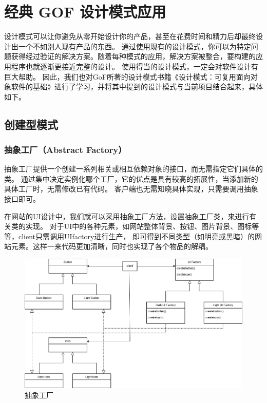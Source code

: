 \documentclass[12pt]{ctexart} %
\begin{document}
\section{经典 GOF 设计模式应用} %
设计模式可以让你避免从零开始设计你的产品，甚至在花费时间和精力后却最终设计出一个不如别人现有产品的东西。
通过使用现有的设计模式，你可以为特定问题获得经过验证的解决方案。随着每种模式的应用，解决方案被整合，要构建的应用程序也就逐渐更接近完整的设计。
使用得当的设计模式，一定会对软件设计有巨大帮助。
因此，我们也对GoF所著的设计模式书籍《设计模式：可复用面向对象软件的基础》进行了学习，并将其中提到的设计模式与当前项目结合起来，具体如下。


\subsection{创建型模式} %
\subsubsection{抽象工厂（Abstract Factory）} 
抽象工厂提供一个创建一系列相关或相互依赖对象的接口，而无需指定它们具体的类。
通过集中决定实例化哪个工厂，它的优点是具有较高的拓展性，当添加新的具体工厂时，无需修改已有代码。
客户端也无需知晓具体实现，只需要调用抽象接口即可。

在网站的UI设计中，我们就可以采用抽象工厂方法，设置抽象工厂类，来进行有关类的实现。
对于UI中的各种元素，如网站整体背景、按钮、图片背景、图标等等，client只需调用UIfactory进行生产，
即可得到不同类型（如明亮或黑暗）的网站元素。这样一来代码更加清晰，同时也实现了各个物品的解耦。
\begin{figure}[H]
  \centering
  \includegraphics[width=\textwidth]{abs_factory.png}
  \caption{抽象工厂}
\end{figure}
\end{document}
